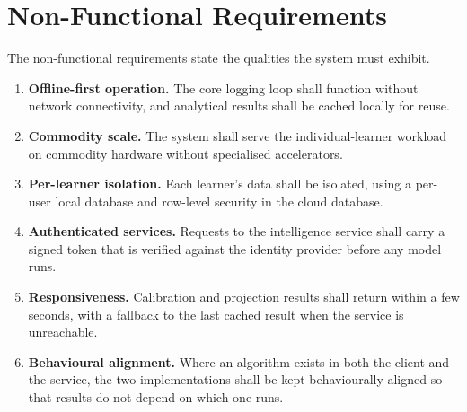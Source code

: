\section{Non-Functional Requirements}
The non-functional requirements state the qualities the system must exhibit.
\begin{enumerate}[label=\textbf{NFR-\arabic*},noitemsep,leftmargin=*]
    \item \textbf{Offline-first operation.} The core logging loop shall function without network connectivity, and analytical results shall be cached locally for reuse.
    \item \textbf{Commodity scale.} The system shall serve the individual-learner workload on commodity hardware without specialised accelerators.
    \item \textbf{Per-learner isolation.} Each learner's data shall be isolated, using a per-user local database and row-level security in the cloud database.
    \item \textbf{Authenticated services.} Requests to the intelligence service shall carry a signed token that is verified against the identity provider before any model runs.
    \item \textbf{Responsiveness.} Calibration and projection results shall return within a few seconds, with a fallback to the last cached result when the service is unreachable.
    \item \textbf{Behavioural alignment.} Where an algorithm exists in both the client and the service, the two implementations shall be kept behaviourally aligned so that results do not depend on which one runs.
\end{enumerate}
